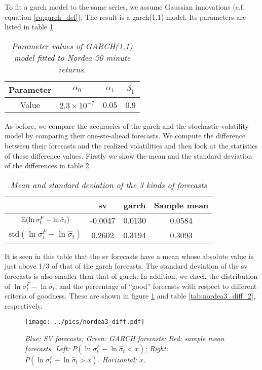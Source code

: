 To fit a \gls{garch} model to the same series, we assume Gaussian
innovations (c.f. equation \ref{eq:garch_def}). The result is a
\gls{garch}(1,1) model. Its parameters are listed in table
\ref{tab:nordea3_garch_param}.
\begin{table}[htb!]
  \centering
  \begin{tabular}{|c|c|c|c|}
    \hline
    Parameter & $\alpha_0$ & $\alpha_1$ & $\beta_1$ \\
    \hline
    Value & $2.3 \times 10^{-7}$ & 0.05 & 0.9\\
    \hline
  \end{tabular}
  \caption{\small \it Parameter values of GARCH(1,1) model fitted to
    Nordea 30-minute returns.}
  \label{tab:nordea3_garch_param}
\end{table}

As before, we compare the accuracies of the \gls{garch} and the stochastic
volatility model by comparing their one-ste-ahead forecasts. We
compute the difference between their forecasts and the realized
volatilities and then look at the statistics of these difference
values. Firstly we show the mean and the standard deviation of the
differences in table \ref{tab:nordea3_diff_1}.
\begin{table}[htb!]
  \centering
  \begin{tabular}{|c|c|c|c|}
    \hline
     & \gls{sv} & \gls{garch} & Sample mean \\
     \hline
    $\mathbb{E}(\ln \sigma^F_t - \ln \hat{\sigma}_t)$ & -0.0047 & 0.0130 & 0.0584 \\
    \hline
     $\text{std}(\ln \sigma^F_t - \ln \hat{\sigma}_t)$ & 0.2602 &
     0.3194 & 0.3093 \\
    \hline
 \end{tabular}
  \caption{\small \it Mean and standard deviation of the 3 kinds of
    forecasts}
  \label{tab:nordea3_diff_1}
\end{table}
It is seen in this table that the \gls{sv} forecasts have a mean whose
absolute value is just above 1/3 of that of the \gls{garch} forecasts. The
standard deviation of the \gls{sv} forecasts is also smaller than that of
\gls{garch}. In addition, we check the distribution of
$\ln \sigma^F_t - \ln \hat{\sigma}_t$, and the percentage of ``good''
forecasts with respect to different criteria of goodness. These are
shown in figure \ref{fig:nordea3_diff} and table
\ref{tab:nordea3_diff_2}, respectively.
\begin{figure}[htb!]
  \centering
    \texttt{[image: ../pics/nordea3\_diff.pdf]}
  \caption{\small \it Blue: SV forecasts; Green: GARCH forecasts; Red:
    sample mean forecasts. Left: $P(\ln \sigma^F_t - \ln \hat{\sigma}_t < x)$;
    Right: $P(\ln \sigma^F_t - \ln \hat{\sigma}_t > x)$. Horizontal: $x$.}
  \label{fig:nordea3_diff}
\end{figure}
